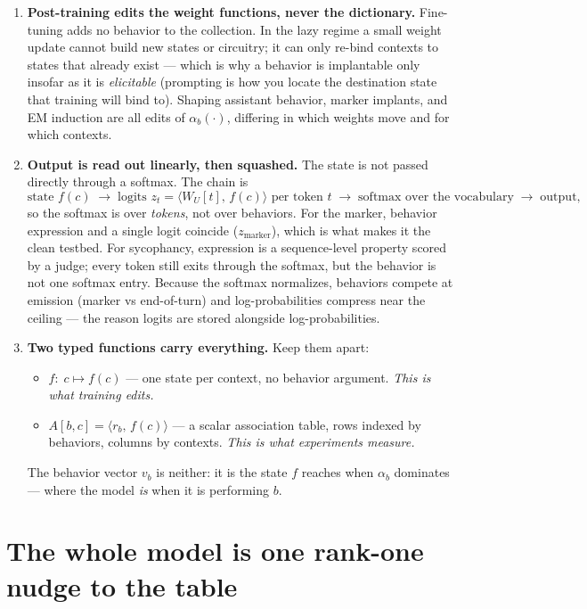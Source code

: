 \documentclass[11pt]{article}
\newcommand{\vb}{v_b}
\begin{document}
\begin{enumerate}[itemsep=6pt]
\item \textbf{Post-training edits the weight functions, never the dictionary.} Fine-tuning adds no behavior to the collection. In the lazy regime a small weight update cannot build new states or circuitry; it can only re-bind contexts to states that already exist --- which is why a behavior is implantable only insofar as it is \emph{elicitable} (prompting is how you locate the destination state that training will bind to). Shaping assistant behavior, marker implants, and EM induction are all edits of $\alpha_b(\cdot)$, differing in which weights move and for which contexts.

\item \textbf{Output is read out linearly, then squashed.} The state is not passed directly through a softmax. The chain is
\begin{equation*}
\text{state } f(c) \;\longrightarrow\; \text{logits } z_t = \langle W_U[t],\, f(c) \rangle \text{ per token } t \;\longrightarrow\; \text{softmax over the vocabulary} \;\longrightarrow\; \text{output},
\end{equation*}
so the softmax is over \emph{tokens}, not over behaviors. For the marker, behavior expression and a single logit coincide ($z_{\text{marker}}$), which is what makes it the clean testbed. For sycophancy, expression is a sequence-level property scored by a judge; every token still exits through the softmax, but the behavior is not one softmax entry. Because the softmax normalizes, behaviors compete at emission (marker vs end-of-turn) and log-probabilities compress near the ceiling --- the reason logits are stored alongside log-probabilities.

\item \textbf{Two typed functions carry everything.} Keep them apart:
\begin{itemize}
\item $f:\; c \mapsto f(c)$ --- one state per context, no behavior argument. \emph{This is what training edits.}
\item $A[b,c] = \langle r_b,\, f(c) \rangle$ --- a scalar association table, rows indexed by behaviors, columns by contexts. \emph{This is what experiments measure.}
\end{itemize}
The behavior vector $\vb$ is neither: it is the state $f$ reaches when $\alpha_b$ dominates --- where the model \emph{is} when it is performing $b$.

\end{enumerate}

\section{The whole model is one rank-one nudge to the table}
\end{document}
